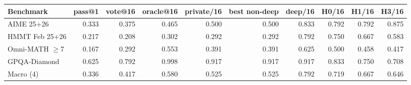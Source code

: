 \begin{tabular}{lrrrrrrrrr}
\toprule
Benchmark & pass@1 & vote@16 & oracle@16 & private/16 & best non-deep & deep/16 & H0/16 & H1/16 & H3/16 \\
\midrule
AIME 25+26 & 0.333 & 0.375 & 0.465 & 0.500 & 0.500 & 0.833 & 0.792 & 0.792 & 0.875 \\
HMMT Feb 25+26 & 0.217 & 0.208 & 0.302 & 0.292 & 0.292 & 0.792 & 0.750 & 0.667 & 0.583 \\
Omni-MATH $\geq$7 & 0.167 & 0.292 & 0.553 & 0.391 & 0.391 & 0.625 & 0.500 & 0.458 & 0.417 \\
GPQA-Diamond & 0.625 & 0.792 & 0.998 & 0.917 & 0.917 & 0.917 & 0.833 & 0.750 & 0.708 \\
Macro (4) & 0.336 & 0.417 & 0.580 & 0.525 & 0.525 & 0.792 & 0.719 & 0.667 & 0.646 \\
\bottomrule
\end{tabular}

